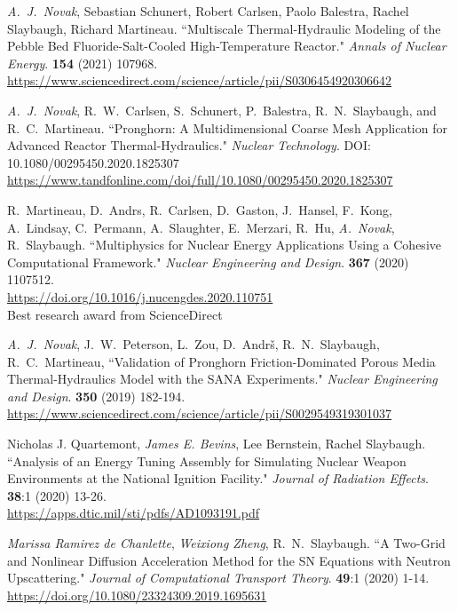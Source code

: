 \begin{bibsection}
\item \textit{A.\ J.\ Novak}, Sebastian Schunert, Robert Carlsen, Paolo Balestra,
Rachel Slaybaugh, Richard Martineau. ``Multiscale Thermal-Hydraulic Modeling of
the Pebble Bed Fluoride-Salt-Cooled High-Temperature Reactor." \textit{Annals of
Nuclear Energy}. \textbf{154} (2021) 107968.\\
\url{https://www.sciencedirect.com/science/article/pii/S0306454920306642}

\item \textit{A.\ J.\ Novak}, R.\ W.\ Carlsen, S.\ Schunert, P.\ Balestra, R.\
N.\ Slaybaugh, and R.\ C.\ Martineau. ``Pronghorn: A Multidimensional Coarse
Mesh Application for Advanced Reactor Thermal-Hydraulics." \textit{Nuclear
Technology}. DOI: 10.1080/00295450.2020.1825307 \\
\url{https://www.tandfonline.com/doi/full/10.1080/00295450.2020.1825307}

\item R.\ Martineau, D.\ Andrs, R.\ Carlsen, D.\ Gaston, J.\
Hansel, F.\ Kong, A.\ Lindsay, C.\ Permann, A.\ Slaughter, E.\
Merzari, R.\ Hu, \textit{A.\ Novak}, R.\ Slaybaugh. ``Multiphysics for
Nuclear Energy Applications Using a Cohesive Computational Framework."
\textit{Nuclear Engineering and Design}. \textbf{367} (2020) 1107512.\\
\url{https://doi.org/10.1016/j.nucengdes.2020.110751}\\
Best research award from ScienceDirect

\item \textit{A.\ J.\ Novak}, J.\ W.\ Peterson, L.\ Zou, D.\ Andr\v{s}, R.\ N.\
Slaybaugh, R.\ C.\ Martineau, ``Validation of Pronghorn Friction-Dominated
Porous Media Thermal-Hydraulics Model with the SANA Experiments."
\textit{Nuclear Engineering and Design}. \textbf{350} (2019) 182-194.\\
\url{https://www.sciencedirect.com/science/article/pii/S0029549319301037}

\item Nicholas J. Quartemont, \textit{James E. Bevins}, Lee Bernstein, Rachel
Slaybaugh. ``Analysis of an Energy Tuning Assembly for Simulating Nuclear Weapon
Environments at the National Ignition Facility." \textit{Journal of Radiation
Effects}. \textbf{38}:1 (2020) 13-26. \\
\url{https://apps.dtic.mil/sti/pdfs/AD1093191.pdf}

\item \textit{Marissa Ramirez de Chanlette}, \textit{Weixiong Zheng}, R.\ N.\
Slaybaugh. ``A Two-Grid and Nonlinear Diffusion Acceleration Method for the SN
Equations with Neutron Upscattering." \textit{Journal of Computational Transport
Theory}. \textbf{49}:1 (2020) 1-14. \\
\url{https://doi.org/10.1080/23324309.2019.1695631}


\end{bibsection}

